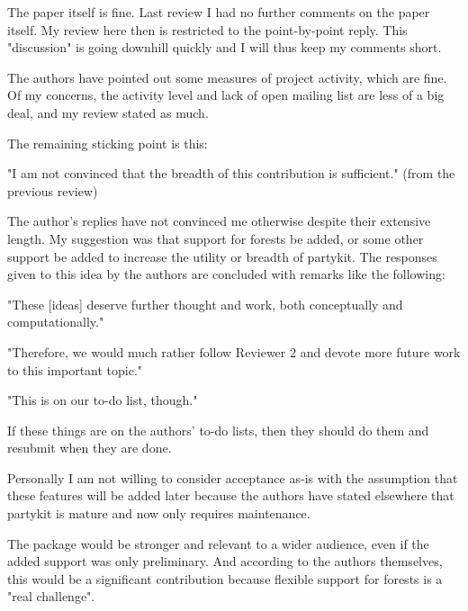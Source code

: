 The paper itself is fine.  Last review I had no further comments on the paper itself.  My review here then is restricted to the point-by-point reply.  This "discussion" is going downhill quickly and I will thus keep my comments short.

The authors have pointed out some measures of project activity, which are fine.  Of my concerns, the activity level and lack of open mailing list are less of a big deal, and my review stated as much.

The remaining sticking point is this:

"I am not convinced that the breadth of this contribution is sufficient." (from the previous review)

The author's replies have not convinced me otherwise despite their extensive length.  My suggestion was that support for forests be added, or some other support be added to increase the utility or breadth of partykit.  The responses given to this idea by the authors are concluded with remarks like the following:

"These [ideas] deserve further thought and work, both conceptually and computationally."

"Therefore, we would much rather follow Reviewer 2 and devote more future work to this important topic."

"This is on our to-do list, though."

If these things are on the authors' to-do lists, then they should do them and resubmit when they are done.

Personally I am not willing to consider acceptance as-is with the assumption that these features will be added later because the authors have stated elsewhere that partykit is mature and now only requires maintenance.

The package would be stronger and relevant to a wider audience, even if the added support was only preliminary.  And according to the authors themselves, this would be a significant contribution because flexible support for forests is a "real challenge".